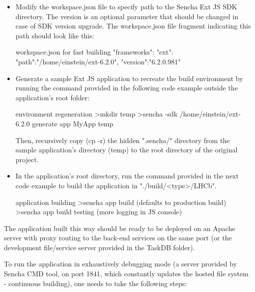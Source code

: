 \begin{itemize}
    \item
        Modify the workspace.json file to specify path to the Sencha Ext JS SDK directory. The version is an optional parameter that should be changed in case of SDK version upgrade. The workspace.json file fragment indicating this path should look like this:
        \begin{sexylisting}[colback=white]{workspace.json for fast building}
"frameworks": {
    "ext": {
        "path":"/home/einstein/ext-6.2.0",
        "version":"6.2.0.981"
    }
}
        \end{sexylisting}
        
    \item
        Generate a sample Ext JS application to recreate the build environment by running the command provided in the following code example outside the application's root folder:
        \begin{sexylisting}[colback=white]{environment regeneration}
>mkdir temp
>sencha -sdk /home/einstein/ext-6.2.0 generate app
 MyApp temp
        \end{sexylisting}
        Then, recursively copy (cp -r) the hidden ".sencha/" directory from the sample application's directory (temp) to the root directory of the original project.
        
    \item
        In the application's root directory, run the command provided in the next code example to build the application in "./build/<type>/LHCb".
        \begin{sexylisting}[colback=white]{application building}
>sencha app build (defaults to production build)
>sencha app build testing (more logging in JS console)
        \end{sexylisting}
\end{itemize}

\noindent
The application built this way should be ready to be deployed on an Apache server with proxy routing to the back-end services on the same port (or the development file/service server provided in the TaskDB folder).

\noindent
To run the application in exhaustively debugging mode (a server provided by Sencha CMD tool, on port 1841, which constantly updates the hosted file system - continuous building), one needs to take the following steps:

